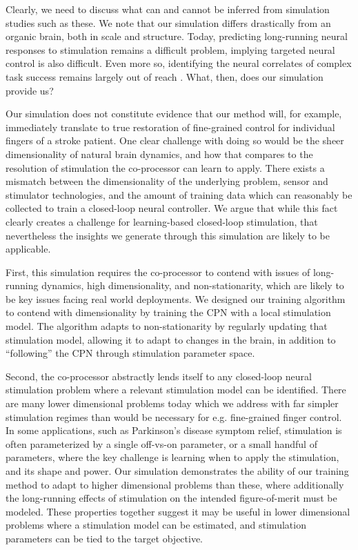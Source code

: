 \documentclass[12pt]{iopart}
\begin{document}
Clearly, we need to discuss what can and cannot be inferred from simulation studies
such as these. We note that our simulation differs drastically from an organic brain, both in scale and structure. Today, predicting long-running neural responses
to stimulation remains a difficult problem, implying targeted neural control is also difficult. Even
more so, identifying the neural correlates of complex task success remains largely out of reach
\cite{khanna.openloop}. What, then, does our simulation provide us?

Our simulation does not constitute evidence that our method will, for example, immediately translate
to true restoration of fine-grained control for individual fingers of a stroke patient. One clear
challenge with doing so would be the sheer dimensionality of natural brain dynamics, and how
that compares to the resolution of stimulation the co-processor can learn to apply.
There exists a  mismatch between the dimensionality of the underlying problem, sensor and
stimulator technologies, and the amount of training data which can reasonably be collected to
train a closed-loop neural controller. We argue that while this fact clearly creates a challenge
for learning-based closed-loop stimulation, that nevertheless the insights we generate through this
simulation are likely to be applicable.

First, this simulation requires the co-processor to contend with issues of long-running
dynamics, high dimensionality, and non-stationarity, which are likely to be key issues
facing real world deployments. We designed our training algorithm to contend with dimensionality
by training the CPN with a local stimulation model. The algorithm adapts to non-stationarity by
regularly updating that stimulation model, allowing it to adapt to changes in the brain, in
addition to ``following'' the CPN through stimulation parameter space.

Second, the co-processor abstractly lends itself to any closed-loop neural stimulation problem
where a relevant stimulation model can be identified. There are many lower dimensional problems
today which we address with far simpler stimulation regimes than would be necessary for
e.g. fine-grained finger control. In some applications, such as Parkinson's disease symptom relief,
stimulation is often parameterized by a single off-vs-on parameter, or a small handful of
parameters, where the key challenge is learning when to apply the stimulation, and
its shape and power. Our simulation demonstrates the ability of our training method to
adapt to higher dimensional problems than these, where additionally the long-running
effects of stimulation on the intended figure-of-merit must be modeled. These properties
together suggest it may be useful in lower dimensional problems where a stimulation model
can be estimated, and stimulation parameters can be tied to the target objective.
\end{document}
